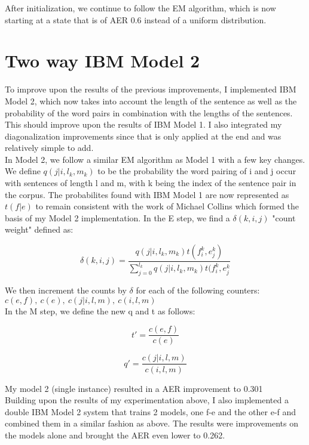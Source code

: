 \documentclass{article}
\begin{document}
After initialization, we continue to follow the EM algorithm, which is now starting at a state that is of AER 0.6 instead of a uniform distribution.

\section{Two way IBM Model 2}

To improve upon the results of the previous improvements, I implemented IBM Model 2, which now takes into account the length of the sentence as well as the probability of the word pairs in combination with the lengths of the sentences. This should improve upon the results of IBM Model 1. I also integrated my diagonalization improvements since that is only applied at the end and was relatively simple to add.\\

In Model 2, we follow a similar EM algorithm as Model 1 with a few key changes. We define $q(j|i,l_k,m_k)$ to be the probability the word pairing of i and j occur with sentences of length l and m, with k being the index of the sentence pair in the corpus. The probabilites found with IBM Model 1 are now represented as $t(f|e)$ to remain consistent with the work of Michael Collins which formed the basis of my Model 2 implementation. In the E step, we find a $\delta(k,i,j)$ "count weight" defined as:

\[
\delta(k,i,j) = \frac{q(j|i,l_k,m_k)t(f^k_i,e^k_j)}{\sum^{l_k}_{j=0}q(j|i,l_k,m_k)t(f^k_i,e^k_j}
\]

We then increment the counts by $\delta$ for each of the following counters:\\
$c(e,f), \ c(e),\ c(j|i,l,m),\ c(i,l,m)$\\

In the M step, we define the new q and t as follows:

\[
t' = \frac{c(e,f)}{c(e)}
\]

\[
q' = \frac{c(j|i,l,m)}{c(i,l,m)}
\]

My model 2 (single instance) resulted in a AER improvement to 0.301\\

Building upon the results of my experimentation above, I also implemented a double IBM Model 2 system that trains 2 models, one f-e and the other e-f and combined them in a similar fashion as above. The results were improvements on the models alone and brought the AER even lower to 0.262.
\end{document}

